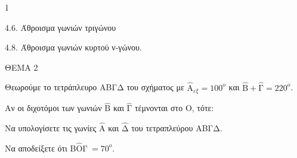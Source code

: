\begin{ylh}{1}
    \item 4.6. Άθροισμα γωνιών τριγώνου
    \item 4.8. Άθροισμα γωνιών κυρτού ν-γώνου.
\end{ylh}

ΘΕΜΑ 2

Θεωρούμε το τετράπλευρο ΑΒΓΔ του σχήματος με ${\widehat{\text{Α}}}_{\varepsilon\xi} = 100^{ο}$ και $\widehat{\text{Β}} + \widehat{\text{Γ}} = 220^{ο}$.

Αν οι διχοτόμοι των γωνιών $\widehat{\text{Β}}$ και $\widehat{\text{Γ}}$ τέμνονται στο Ο, τότε:

\begin{alist}
\item Να υπολογίσετε τις γωνίες $\widehat{\text{Α}}$ και $\widehat{\text{Δ}}$ του τετραπλεύρου ΑΒΓΔ.


\item Να αποδείξετε ότι Β$\widehat{\text{Ο}}$Γ$\  = 70^{ο}$.



\end{alist}
